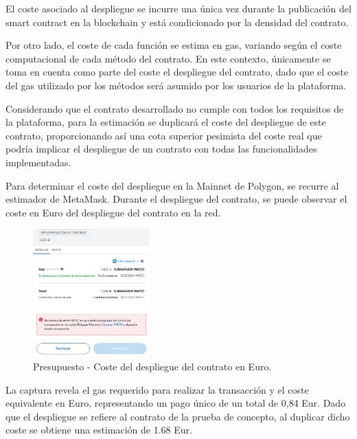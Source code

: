 El coste asociado al despliegue se incurre una única vez durante la publicación del smart contract en la blockchain y está condicionado por la densidad del contrato. 

\bigskip

Por otro lado, el coste de cada función se estima en gas, variando según el coste computacional de cada método del contrato. En este contexto, únicamente se toma en cuenta como parte del coste el despliegue del contrato, dado que el coste del gas utilizado por los métodos será asumido por los usuarios de la plataforma.

\bigskip

Considerando que el contrato desarrollado no cumple con todos los requisitos de la plataforma, para la estimación se duplicará el coste del despliegue de este contrato, proporcionando así una cota superior pesimista del coste real que podría implicar el despliegue de un contrato con todas las funcionalidades implementadas. 

\bigskip

Para determinar el coste del despliegue en la Mainnet de Polygon, se recurre al estimador de MetaMask. Durante el despliegue del contrato, se puede observar el coste en Euro del despliegue del contrato en la red.

\bigskip

\begin{figure}[H]
        \centering
        \includegraphics[width=0.4\textwidth]{img/capturas/contractcost.png}
        \caption{Presupuesto - Coste del despliegue del contrato en Euro.}
        \label{fig:configApi}
\end{figure}

La captura revela el gas requerido para realizar la transacción y el coste equivalente en Euro, representando un pago único de un total de 0,84 Eur. Dado que el despliegue se refiere al contrato de la prueba de concepto, al duplicar dicho coste se obtiene una estimación de 1.68 Eur.

